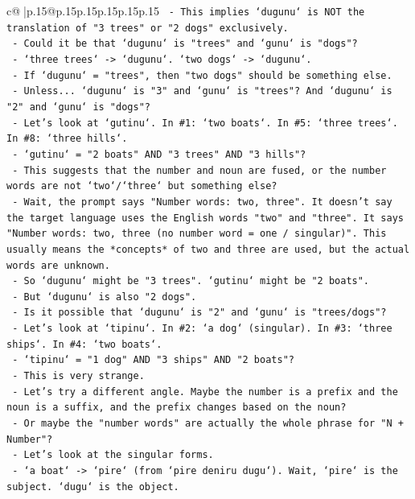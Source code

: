 \documentclass{article}
\begin{document}
{\begin{supertabular}{c@{$\;$}|p{.15\linewidth}@{}p{.15\linewidth}p{.15\linewidth}p{.15\linewidth}p{.15\linewidth}p{.15\linewidth}}
{{{\texttt{   {-} This implies `dugunu` is NOT the translation of "3 trees" or "2 dogs" exclusively.} \\
\texttt{   {-} Could it be that `dugunu` is "trees" and `gunu` is "dogs"?} \\
\texttt{   {-} `three trees` {-}> `dugunu`. `two dogs` {-}> `dugunu`.} \\
\texttt{   {-} If `dugunu` = "trees", then "two dogs" should be something else.} \\
\texttt{   {-} Unless... `dugunu` is "3" and `gunu` is "trees"? And `dugunu` is "2" and `gunu` is "dogs"?} \\
\texttt{   {-} Let's look at `gutinu`. In \#1: `two boats`. In \#5: `three trees`. In \#8: `three hills`.} \\
\texttt{   {-} `gutinu` = "2 boats" AND "3 trees" AND "3 hills"?} \\
\texttt{   {-} This suggests that the number and noun are fused, or the number words are not `two`/`three` but something else?} \\
\texttt{   {-} Wait, the prompt says "Number words: two, three". It doesn't say the target language uses the English words "two" and "three". It says "Number words: two, three (no number word = one / singular)". This usually means the *concepts* of two and three are used, but the actual words are unknown.} \\
\texttt{   {-} So `dugunu` might be "3 trees". `gutinu` might be "2 boats".} \\
\texttt{   {-} But `dugunu` is also "2 dogs".} \\
\texttt{   {-} Is it possible that `dugunu` is "2" and `gunu` is "trees/dogs"?} \\
\texttt{   {-} Let's look at `tipinu`. In \#2: `a dog` (singular). In \#3: `three ships`. In \#4: `two boats`.} \\
\texttt{   {-} `tipinu` = "1 dog" AND "3 ships" AND "2 boats"?} \\
\texttt{   {-} This is very strange.} \\
\texttt{   {-} Let's try a different angle. Maybe the number is a prefix and the noun is a suffix, and the prefix changes based on the noun?} \\
\texttt{   {-} Or maybe the "number words" are actually the whole phrase for "N + Number"?} \\
\texttt{   {-} Let's look at the singular forms.} \\
\texttt{   {-} `a boat` {-}> `pire` (from `pire deniru dugu`). Wait, `pire` is the subject. `dugu` is the object.} \\
}}}
\end{supertabular}}
\end{document}
